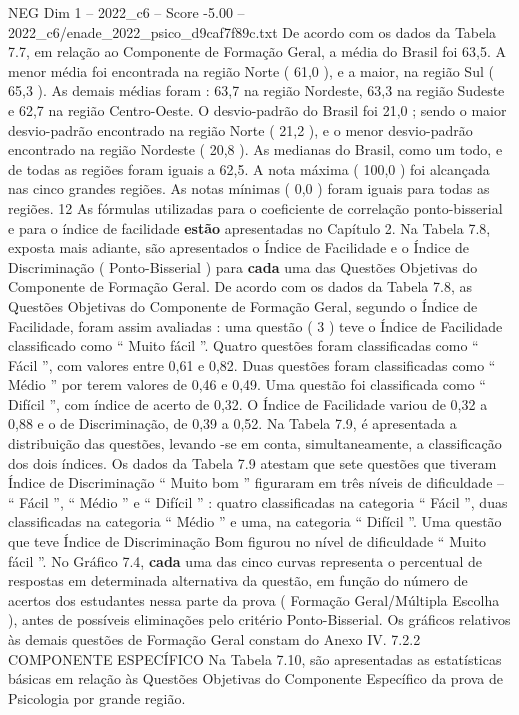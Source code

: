\begin{textsample}{NEG Dim 1 – 2022\_c6 – Score -5.00 – 2022\_c6/enade\_2022\_psico\_d9caf7f89c.txt}
De acordo com os dados da Tabela 7.7, em relação ao Componente de Formação Geral, a média do Brasil foi 63,5.
A menor média foi encontrada na região Norte ( 61,0 ), e a maior, na região Sul ( 65,3 ).
As demais médias foram : 63,7 na região Nordeste, 63,3 na região Sudeste e 62,7 na região Centro-Oeste.
O desvio-padrão do Brasil foi 21,0 ; sendo o maior desvio-padrão encontrado na região Norte ( 21,2 ), e o menor desvio-padrão encontrado na região Nordeste ( 20,8 ).
As medianas do Brasil, como um todo, e de todas as regiões foram iguais a 62,5.
A nota máxima ( 100,0 ) foi alcançada nas cinco grandes regiões.
As notas mínimas ( 0,0 ) foram iguais para todas as regiões. 12 As fórmulas utilizadas para o coeficiente de correlação ponto-bisserial e para o índice de facilidade \textbf{estão} apresentadas no Capítulo 2.
Na Tabela 7.8, exposta mais adiante, são apresentados o Índice de Facilidade e o Índice de Discriminação ( Ponto-Bisserial ) para \textbf{cada} uma das Questões Objetivas do Componente de Formação Geral.
De acordo com os dados da Tabela 7.8, as Questões Objetivas do Componente de Formação Geral, segundo o Índice de Facilidade, foram assim avaliadas : uma questão ( 3 ) teve o Índice de Facilidade classificado como “ Muito fácil ”.
Quatro questões foram classificadas como “ Fácil ”, com valores entre 0,61 e 0,82.
Duas questões foram classificadas como “ Médio ” por terem valores de 0,46 e 0,49.
Uma questão foi classificada como “ Difícil ”, com índice de acerto de 0,32.
O Índice de Facilidade variou de 0,32 a 0,88 e o de Discriminação, de 0,39 a 0,52.
Na Tabela 7.9, é apresentada a distribuição das questões, levando -se em conta, simultaneamente, a classificação dos dois índices.
Os dados da Tabela 7.9 atestam que sete questões que tiveram Índice de Discriminação “ Muito bom ” figuraram em três níveis de dificuldade – “ Fácil ”, “ Médio ” e “ Difícil ” : quatro classificadas na categoria “ Fácil ”, duas classificadas na categoria “ Médio ” e uma, na categoria “ Difícil ”.
Uma questão que teve Índice de Discriminação Bom figurou no nível de dificuldade “ Muito fácil ”.
No Gráfico 7.4, \textbf{cada} uma das cinco curvas representa o percentual de respostas em determinada alternativa da questão, em função do número de acertos dos estudantes nessa parte da prova ( Formação Geral/Múltipla Escolha ), antes de possíveis eliminações pelo critério Ponto-Bisserial.
Os gráficos relativos às demais questões de Formação Geral constam do Anexo IV. 7.2.2 COMPONENTE ESPECÍFICO Na Tabela 7.10, são apresentadas as estatísticas básicas em relação às Questões Objetivas do Componente Específico da prova de Psicologia por grande região.

\end{textsample}
